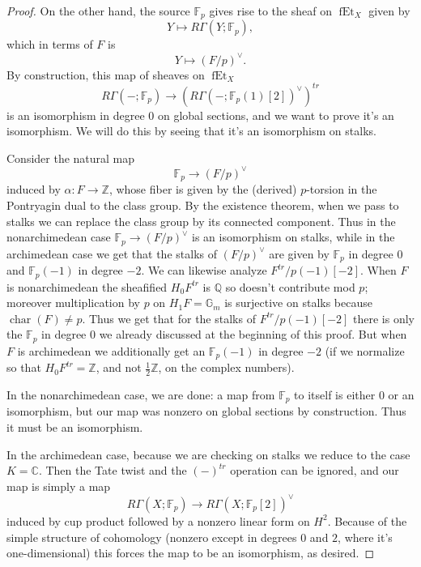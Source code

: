 \documentclass[10pt,a4paper]{amsart}
\newcommand{\mbb}{\mathbb}
\newcommand{\on}{\operatorname}
\begin{document}
\begin{proof}
On the other hand, the source $\mbb{F}_p$ gives rise to the sheaf on $\on{fEt}_X$ given by
$$Y\mapsto R\Gamma(Y;\mbb{F}_p),$$
which in terms of $F$ is
$$Y\mapsto (F/p)^\vee.$$
By construction, this map of sheaves on $\on{fEt}_X$
$$R\Gamma(-;\mbb{F}_p) \to (R\Gamma(-;\mbb{F}_p(1)[2])^\vee)^{tr}$$
is an isomorphism in degree $0$ on global sections, and we want to prove it's an isomorphism.  We will do this by seeing that it's an isomorphism on stalks.

Consider the natural map
$$\mbb{F}_p \to (F/p)^\vee$$
induced by $\alpha:F\to\mbb{Z}$, whose fiber is given by the (derived) $p$-torsion in the Pontryagin dual to the class group.  By the existence theorem, when we pass to stalks we can replace the class group by its connected component.  Thus in the nonarchimedean case $\mbb{F}_p \to (F/p)^\vee$ is an isomorphism on stalks, while in the archimedean case we get that the stalks of $(F/p)^\vee$ are given by $\mbb{F}_p$ in degree $0$ and $\mbb{F}_p(-1)$ in degree $-2$.  We can likewise analyze $F^{tr}/p(-1)[-2]$.  When $F$ is nonarchimedean the sheafified $H_0F^{tr}$ is $\mbb{Q}$ so doesn't contribute mod $p$; moreover multiplication by $p$ on $H_1F=\mbb{G}_m$ is surjective on stalks because $\on{char}(F)\neq p$.  Thus we get that for the stalks of $F^{tr}/p(-1)[-2]$ there is only the $\mbb{F}_p$ in degree $0$ we already discussed at the beginning of this proof.  But when $F$ is archimedean we additionally get an $\mbb{F}_p(-1)$ in degree $-2$ (if we normalize so that $H_0F^{tr}=\mbb{Z}$, and not $\frac{1}{2}\mbb{Z}$, on the complex numbers).

In the nonarchimedean case, we are done: a map from $\mbb{F}_p$ to itself is either $0$ or an isomorphism, but our map was nonzero on global sections by construction.  Thus it must be an isomorphism.

In the archimedean case, because we are checking on stalks we reduce to the case $K=\mbb{C}$.  Then the Tate twist and the $(-)^{tr}$ operation can be ignored, and our map is simply a map
$$R\Gamma(X;\mbb{F}_p) \to R\Gamma(X;\mbb{F}_p[2])^\vee$$
induced by cup product followed by a nonzero linear form on $H^2$.  Because of the simple structure of cohomology (nonzero except in degrees $0$ and $2$, where it's one-dimensional) this forces the map to be an isomorphism, as desired.


\end{proof}
\end{document}
